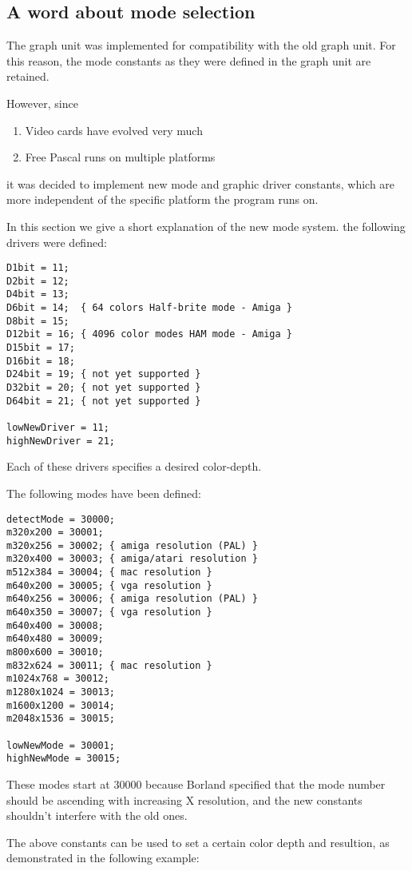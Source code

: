 \subsection{A word about mode selection}
The graph unit was implemented for compatibility with the old \tp graph
unit. For this reason, the mode constants as they were defined in the
\tp graph unit are retained. 

However, since
\begin{enumerate}
\item Video cards have evolved very much
\item Free Pascal runs on multiple platforms
\end{enumerate}
it was decided to implement new mode and graphic driver constants, 
which are more independent of the specific platform the program runs on.

In this section we give a short explanation of the new mode system. the
following drivers were defined:
\begin{verbatim}
D1bit = 11;
D2bit = 12;
D4bit = 13;
D6bit = 14;  { 64 colors Half-brite mode - Amiga }
D8bit = 15;
D12bit = 16; { 4096 color modes HAM mode - Amiga }
D15bit = 17;
D16bit = 18;
D24bit = 19; { not yet supported }
D32bit = 20; { not yet supported }
D64bit = 21; { not yet supported }

lowNewDriver = 11;
highNewDriver = 21;
\end{verbatim}
Each of these drivers specifies a desired color-depth. 

The following modes have been defined:
\begin{verbatim}
detectMode = 30000;
m320x200 = 30001;  
m320x256 = 30002; { amiga resolution (PAL) }
m320x400 = 30003; { amiga/atari resolution }
m512x384 = 30004; { mac resolution }
m640x200 = 30005; { vga resolution }
m640x256 = 30006; { amiga resolution (PAL) }
m640x350 = 30007; { vga resolution }
m640x400 = 30008;
m640x480 = 30009;
m800x600 = 30010;
m832x624 = 30011; { mac resolution }
m1024x768 = 30012;
m1280x1024 = 30013;
m1600x1200 = 30014;
m2048x1536 = 30015;

lowNewMode = 30001;
highNewMode = 30015;
\end{verbatim}
These modes start at 30000 because Borland specified that the mode number
should be ascending with increasing X resolution, and the new constants 
shouldn't interfere with the old ones.

The above constants can be used to set a certain color depth and resultion,
as demonstrated in the following example:

